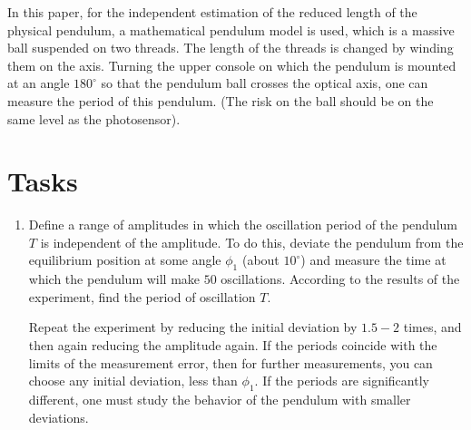 \documentclass{LabWorkEng}
\begin{document}
In this paper, for the independent estimation of the reduced length of the physical pendulum, a mathematical pendulum model is used, which is a massive ball suspended on two threads. The length of the threads is changed by winding them on the axis. Turning the upper console on which the pendulum is mounted at an angle $180^\circ$ so that the pendulum ball crosses the optical axis, one can measure the period of this pendulum. (The risk on the ball should be on the same level as the photosensor).

\section{Tasks}
\begin{enumerate}
	\item Define a range of amplitudes in which the oscillation period of the pendulum $T$ is independent of the amplitude. To do this, deviate the pendulum from the equilibrium position at some angle $\phi_1$ (about $10^\circ$) and measure the time at which the pendulum will make $50$ oscillations. According to the results of the experiment, find the period of oscillation $T$.

	      Repeat the experiment by reducing the initial deviation by $1.5-2$ times, and then again reducing the amplitude again. If the periods coincide with the limits of the measurement error, then for further measurements, you can choose any initial deviation, less than $\phi_1$. If the periods are significantly different, one must study the behavior of the pendulum with smaller deviations.


\end{enumerate}
\end{document}
